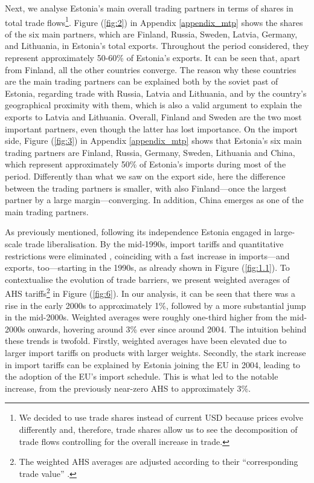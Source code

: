 \documentclass[a4paper,10pt]{article}
\begin{document}
Next, we analyse Estonia's main overall trading partners in terms of shares in total trade flows\footnote{We decided to use trade shares instead of current USD because prices evolve differently and, therefore, trade shares allow us to see the decomposition of trade flows controlling for the overall increase in trade.}. Figure (\ref{fig:2}) in Appendix \ref{appendix_mtp} shows the shares of the six main partners, which are Finland, Russia, Sweden, Latvia, Germany, and Lithuania, in Estonia's total exports. Throughout the period considered, they represent approximately 50-60\% of Estonia's exports. It can be seen that, apart from Finland, all the other countries converge. The reason why these countries are the main trading partners can be explained both by the soviet past of Estonia, regarding trade with Russia, Latvia and Lithuania, and by the country's geographical proximity with them, which is also a valid argument to explain the exports to Latvia and Lithuania. Overall, Finland and Sweden are the two most important partners, even though the latter has lost importance. On the import side, Figure (\ref{fig:3}) in Appendix \ref{appendix_mtp} shows that Estonia's six main trading partners are Finland, Russia, Germany, Sweden, Lithuania and China, which represent approximately 50\% of Estonia's imports during most of the period. Differently than what we saw on the export side, here the difference between the trading partners is smaller, with also Finland---once the largest partner by a large margin---converging. In addition, China emerges as one of the main trading partners.

As previously mentioned, following its independence Estonia engaged in large-scale trade liberalisation. By the mid-1990s, import tariffs and quantitative restrictions were eliminated \citep{paas_gravity_2000}, coinciding with a fast increase in imports---and exports, too---starting in the 1990s, as already shown in Figure (\ref{fig:1.1}). To contextualise the evolution of trade barriers, we present weighted averages of AHS tariffs\footnote{The weighted AHS averages are adjusted according to their “corresponding trade value” \citep{world_integrated_trade_solution_estonia_2024}.} in Figure (\ref{fig:6}). In our analysis, it can be seen that there was a rise in the early 2000s to approximately 1\%, followed by a more substantial jump in the mid-2000s. Weighted averages were roughly one-third higher from the mid-2000s onwards, hovering around 3\% ever since around 2004. The intuition behind these trends is twofold. Firstly, weighted averages have been elevated due to larger import tariffs on products with larger weights. Secondly, the stark increase in import tariffs can be explained by Estonia joining the EU in 2004, leading to the adoption of the EU’s import schedule. This is what led to the notable increase, from the previously near-zero AHS to approximately 3\%.
\end{document}
